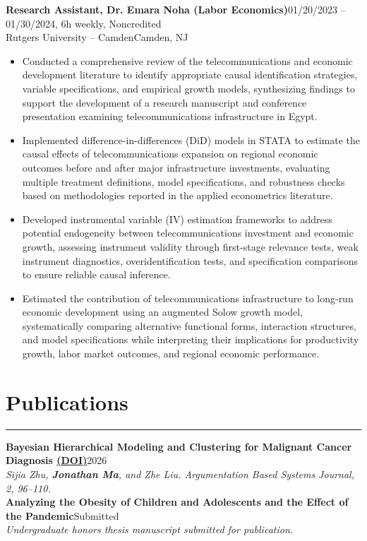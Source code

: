 \documentclass[11pt]{article}
\newcommand{\resheading}[1]{%
  \Needspace{6\baselineskip}%
  \section*{#1}\vspace{-4pt}\color{rulegray}\hrule\vspace{4pt}\color{black}
}
\newcommand{\workentry}[4]{%
  \Needspace{7\baselineskip}%
  \textbf{#1}\hfill #2\\[-1pt]%
  #3\hfill #4\\[-8pt]%
}
\newcommand{\pubentry}[3]{%
  \Needspace{7\baselineskip}%
  \textbf{#1}\hfill #2\\[-1pt]%
  \textit{#3}\\[-8pt]%
}
\newenvironment{tightitemize}{%
  \vspace{-2pt}%
  \begin{itemize}[leftmargin=*,topsep=0pt,itemsep=1pt,parsep=0pt,partopsep=0pt]
}{%
  \end{itemize}\vspace{4pt}
}
\begin{document}
\workentry
{Research Assistant, Dr. Emara Noha (Labor Economics)}
{01/20/2023 -- 01/30/2024, 6h weekly, Noncredited}
{Rutgers University -- Camden}
{Camden, NJ}
\begin{tightitemize}
\item Conducted a comprehensive review of the telecommunications and economic development literature to identify appropriate causal identification strategies, variable specifications, and empirical growth models, synthesizing findings to support the development of a research manuscript and conference presentation examining telecommunications infrastructure in Egypt.
\item Implemented difference-in-differences (DiD) models in STATA to estimate the causal effects of telecommunications expansion on regional economic outcomes before and after major infrastructure investments, evaluating multiple treatment definitions, model specifications, and robustness checks based on methodologies reported in the applied econometrics literature.
\item Developed instrumental variable (IV) estimation frameworks to address potential endogeneity between telecommunications investment and economic growth, assessing instrument validity through first-stage relevance tests, weak instrument diagnostics, overidentification tests, and specification comparisons to ensure reliable causal inference.
\item Estimated the contribution of telecommunications infrastructure to long-run economic development using an augmented Solow growth model, systematically comparing alternative functional forms, interaction structures, and model specifications while interpreting their implications for productivity growth, labor market outcomes, and regional economic performance.
\end{tightitemize}


\resheading{Publications}

\pubentry
{Bayesian Hierarchical Modeling and Clustering for Malignant Cancer Diagnosis \href{https://doi.org/10.59543/w22sya71}{(DOI)}}
{2026}
{Sijia Zhu, \textbf{Jonathan Ma}, and Zhe Liu. \textit{Argumentation Based Systems Journal}, 2, 96--110.}

\pubentry
{Analyzing the Obesity of Children and Adolescents and the Effect of the Pandemic}
{Submitted}
{Undergraduate honors thesis manuscript submitted for publication.}
\end{document}
